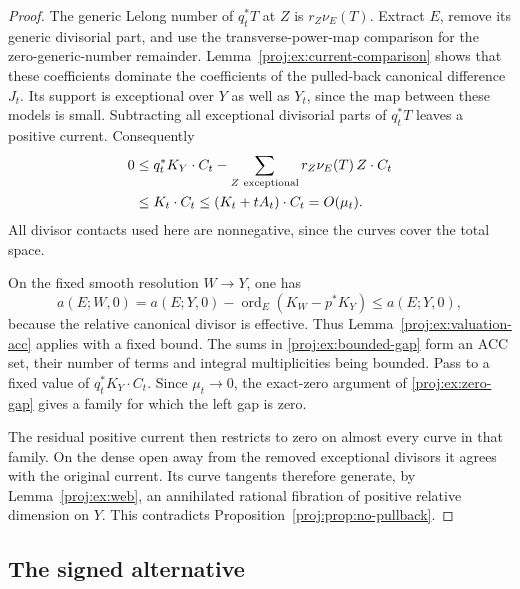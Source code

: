 \documentclass[11pt,letterpaper]{article}
\DeclareMathOperator{\ord}{ord}
\theoremstyle{definition}
\theoremstyle{remark}
\begin{document}
\begin{proof}
The generic Lelong number of \(q_t^*T\) at \(Z\) is
\(r_Z\nu_E(T)\). Extract \(E\), remove its generic
divisorial part, and use the transverse-power-map
comparison for the zero-generic-number remainder.
Lemma~\ref{proj:ex:current-comparison} shows that these
coefficients dominate the coefficients of the pulled-back
canonical difference \(J_t\). Its support is exceptional
over \(Y\) as well as \(Y_t\), since the map between these
models is small. Subtracting all exceptional divisorial
parts of \(q_t^*T\) leaves a positive current. Consequently
\begin{equation}\label{proj:ex:bounded-gap}
 \begin{split}
 0&\leq q_t^*K_Y\cdot C_t
       -\sum_{Z\ {\rm exceptional}}
                r_Z\nu_E(T)\,Z\cdot C_t\\
  &\leq K_t\cdot C_t
   \leq (K_t+tA_t)\cdot C_t
   =O(\mu_t).
 \end{split}
\end{equation}
All divisor contacts used here are nonnegative, since the
curves cover the total space.

On the fixed smooth resolution \(W\to Y\), one has
\[
 a(E;W,0)=a(E;Y,0)
       -\ord_E(K_W-p^*K_Y)\leq a(E;Y,0),
\]
because the relative canonical divisor is effective.
Thus Lemma~\ref{proj:ex:valuation-acc} applies with a fixed
bound. The sums in \eqref{proj:ex:bounded-gap} form an ACC
set, their number of terms and integral multiplicities
being bounded. Pass to a fixed value of
\(q_t^*K_Y\cdot C_t\). Since \(\mu_t\to0\), the
exact-zero argument of \eqref{proj:ex:zero-gap} gives a family
for which the left gap is zero.

The residual positive current then restricts to zero on
almost every curve in that family. On the dense open
away from the removed exceptional divisors it agrees
with the original current. Its curve tangents therefore
generate, by Lemma~\ref{proj:ex:web}, an annihilated rational
fibration of positive relative dimension on \(Y\).
This contradicts Proposition~\ref{proj:prop:no-pullback}.
\end{proof}

\subsection{The signed alternative}
\end{document}
